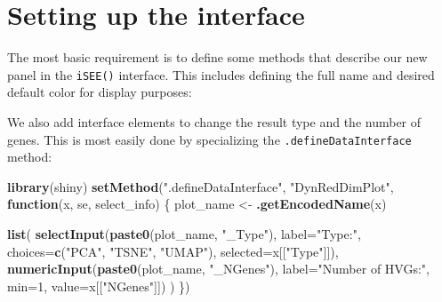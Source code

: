 \documentclass[
]{book}
\newenvironment{Shaded}{\begin{snugshade}}{\end{snugshade}}
\newcommand{\ControlFlowTok}[1]{\textcolor[rgb]{0.13,0.29,0.53}{\textbf{#1}}}
\newcommand{\DataTypeTok}[1]{\textcolor[rgb]{0.13,0.29,0.53}{#1}}
\newcommand{\DecValTok}[1]{\textcolor[rgb]{0.00,0.00,0.81}{#1}}
\newcommand{\KeywordTok}[1]{\textcolor[rgb]{0.13,0.29,0.53}{\textbf{#1}}}
\newcommand{\NormalTok}[1]{#1}
\newcommand{\StringTok}[1]{\textcolor[rgb]{0.31,0.60,0.02}{#1}}
\begin{document}
\hypertarget{setting-up-the-interface}{%
\section{Setting up the interface}\label{setting-up-the-interface}}

The most basic requirement is to define some methods that describe our new panel in the \texttt{iSEE()} interface.
This includes defining the full name and desired default color for display purposes:

\begin{Shaded}
\end{Shaded}

We also add interface elements to change the result type and the number of genes.
This is most easily done by specializing the \texttt{.defineDataInterface} method:

\begin{Shaded}
\begin{Highlighting}[]
\KeywordTok{library}\NormalTok{(shiny)}
\KeywordTok{setMethod}\NormalTok{(}\StringTok{".defineDataInterface"}\NormalTok{, }\StringTok{"DynRedDimPlot"}\NormalTok{, }\ControlFlowTok{function}\NormalTok{(x, se, select_info) \{}
\NormalTok{    plot_name <-}\StringTok{ }\KeywordTok{.getEncodedName}\NormalTok{(x)}

    \KeywordTok{list}\NormalTok{(}
        \KeywordTok{selectInput}\NormalTok{(}\KeywordTok{paste0}\NormalTok{(plot_name, }\StringTok{"_Type"}\NormalTok{), }\DataTypeTok{label=}\StringTok{"Type:"}\NormalTok{,}
            \DataTypeTok{choices=}\KeywordTok{c}\NormalTok{(}\StringTok{"PCA"}\NormalTok{, }\StringTok{"TSNE"}\NormalTok{, }\StringTok{"UMAP"}\NormalTok{), }\DataTypeTok{selected=}\NormalTok{x[[}\StringTok{"Type"}\NormalTok{]]),}
        \KeywordTok{numericInput}\NormalTok{(}\KeywordTok{paste0}\NormalTok{(plot_name, }\StringTok{"_NGenes"}\NormalTok{), }\DataTypeTok{label=}\StringTok{"Number of HVGs:"}\NormalTok{,}
            \DataTypeTok{min=}\DecValTok{1}\NormalTok{, }\DataTypeTok{value=}\NormalTok{x[[}\StringTok{"NGenes"}\NormalTok{]])}
\NormalTok{    )}
\NormalTok{\})}
\end{Highlighting}
\end{Shaded}
\end{document}
